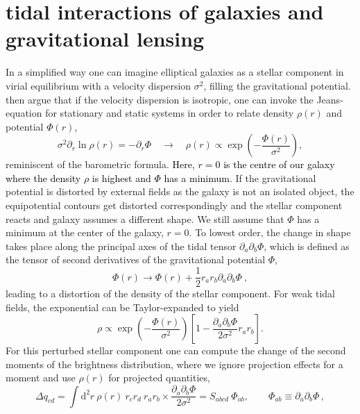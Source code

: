 \documentclass[a4paper,fleqn,usenatbib]{mnras}
\newcommand\spirou[1]{\textcolor{black}{#1}}
\newcommand{\dd}{\mathrm{d}}
\begin{document}
\section{tidal interactions of galaxies and gravitational lensing}\label{sect_tidal}
In a simplified way one can imagine elliptical galaxies as a stellar component in virial equilibrium with a velocity dispersion $\sigma^2$, filling the gravitational potential. \citet{piras_mass_2018} then argue that if the velocity dispersion is isotropic, one can invoke the Jeans-equation for stationary and static systems in order to relate density $\rho(r)$ and potential $\Phi(r)$,
\begin{equation}
\sigma^2\partial_r\ln\rho(r) = -\partial_r\Phi
\quad\rightarrow\quad
\rho(r) \propto \exp\left(-\frac{\Phi(r)}{\sigma^2}\right),
\label{eqn_jeans}
\end{equation}
reminiscent of the barometric formula. \spirou{Here, $r = 0$ is the centre of our galaxy where the density $\rho$ is highest and $\Phi$ has a minimum.} If the gravitational potential is distorted by external fields as the galaxy is not an isolated object, the equipotential contours get distorted correspondingly and the stellar component reacts and galaxy assumes a different shape.  We still assume that  $\Phi$ has a minimum at the center of the galaxy, $r = 0$. To lowest order, the change in shape takes place along the principal axes of the tidal tensor $\partial_a\partial_b\Phi$, which is defined as the tensor of second derivatives of the gravitational potential $\Phi$,
\begin{equation}
\Phi(r) \rightarrow \Phi(r) + \frac{1}{2}r_a r_b\partial_a\partial_b\Phi\:,
\label{eqn_tidal_taylor}
\end{equation}
leading to a distortion of the density of the stellar component. For weak tidal fields, the exponential can be Taylor-expanded to yield
\begin{equation}
\rho \propto 
\exp\left(-\frac{\Phi(r)}{\sigma^2}\right)\left[1-\frac{\partial_a\partial_b\Phi}{2\sigma^2}r_a r_b\right].
\end{equation}
For this perturbed stellar component one can compute the change of the second moments of the brightness distribution, where we ignore projection effects for a moment and use $\rho(r)$ for projected quantities,
\begin{equation}
\Delta q_{cd} = 
\int\dd^2r\:\rho(r)\: r_c r_d\: r_a r_b\times\frac{\partial_a\partial_b\Phi}{2\sigma^2} = S_{abcd}\:\Phi_{ab},   \qquad  \Phi_{ab} \equiv \partial_a\partial_b\Phi\,,
\label{eqn_2nd_moment}
\end{equation}
\end{document}
